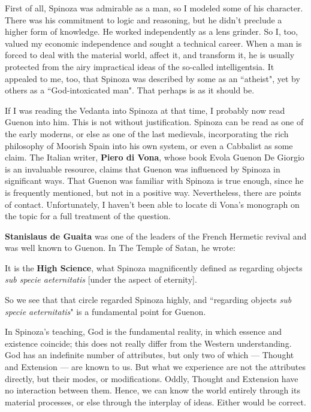 First of all, Spinoza was admirable as a man, so I modeled some of his character. There was his commitment to logic and reasoning, but he didn't preclude a higher form of knowledge. He worked independently as a lens grinder. So I, too, valued my economic independence and sought a technical career. When a man is forced to deal with the material world, affect it, and transform it, he is usually protected from the airy impractical ideas of the so-called intelligentsia. It appealed to me, too, that Spinoza was described by some as an ``atheist", yet by others as a ``God-intoxicated man". That perhaps is as it should be.

If I was reading the Vedanta into Spinoza at that time, I probably now read Guenon into him. This is not without justification. Spinoza can be read as one of the early moderns, or else as one of the last medievals, incorporating the rich philosophy of Moorish Spain into his own system, or even a Cabbalist as some claim. The Italian writer, \textbf{Piero di Vona}, whose book Evola Guenon De Giorgio is an invaluable resource, claims that Guenon was influenced by Spinoza in significant ways. That Guenon was familiar with Spinoza is true enough, since he is frequently mentioned, but not in a positive way. Nevertheless, there are points of contact. Unfortunately, I haven't been able to locate di Vona's monograph on the topic for a full treatment of the question.

\textbf{Stanislaus de Guaita} was one of the leaders of the French Hermetic revival and was well known to Guenon. In The Temple of Satan, he wrote:

\begin{quotex}
It is the \textbf{High Science}, what Spinoza magnificently defined as regarding objects \emph{sub specie aeternitatis} [under the aspect of eternity]. 

\end{quotex}
So we see that that circle regarded Spinoza highly, and ``regarding objects \emph{sub specie aeternitatis}" is a fundamental point for Guenon.

In Spinoza's teaching, God is the fundamental reality, in which essence and existence coincide; this does not really differ from the Western understanding. God has an indefinite number of attributes, but only two of which — Thought and Extension — are known to us. But what we experience are not the attributes directly, but their modes, or modifications. Oddly, Thought and Extension have no interaction between them. Hence, we can know the world entirely through its material processes, or else through the interplay of ideas. Either would be correct.

